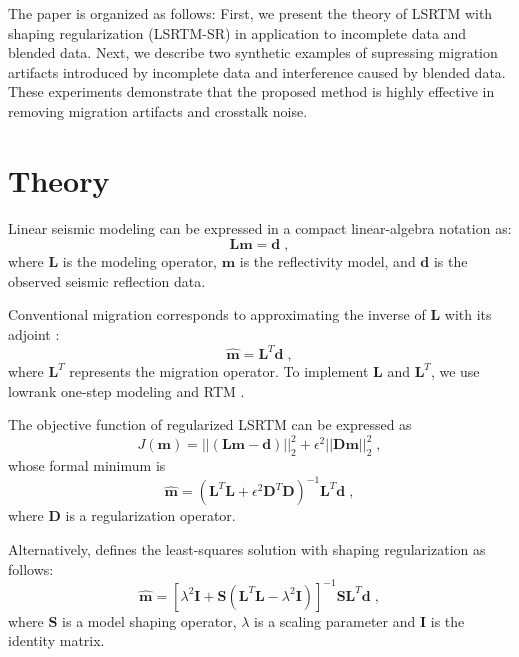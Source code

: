 The paper is organized as follows: First, we present the theory of LSRTM with shaping regularization 
(LSRTM-SR) in application to incomplete data and blended data.
Next, we describe two synthetic examples of supressing migration artifacts introduced by incomplete data and interference caused by blended data.
These experiments demonstrate that the proposed method is highly effective in removing migration artifacts and crosstalk noise.
 
\section{Theory}
Linear seismic modeling can be expressed in a compact linear-algebra notation as:
\begin{equation}
\label{eq:bornmodel}
\mathbf{Lm} = \mathbf{d} \; ,
\end{equation}
where $\mathbf{L}$ is the modeling operator, $\mathbf{m}$ is the reflectivity model, and $\mathbf{d}$ is the observed seismic reflection data.

Conventional migration corresponds to approximating the inverse of $\mathbf{L}$ with its adjoint \cite[]{jon92}:
\begin{equation}
\label{eq:cam}
\hat{\mathbf{m}} = \mathbf{L}^T\mathbf{d} \; ,
\end{equation}  
where $\mathbf{L}^T$ represents the migration operator. 
To implement $\mathbf{L}$ and $\mathbf{L}^T$, we use lowrank one-step modeling and RTM \cite[]{junzhe14,sun15}.

The objective function of regularized LSRTM can be expressed as
\begin{equation}
\label{eq:lsrtm}
J(\mathbf{m})=\mathbf{||(Lm-d)||}^2_2+\epsilon^2||\mathbf{Dm}||^2_2 \; ,
\end{equation}
whose formal minimum is
\begin{equation}
\label{eq:solution}
\hat{\mathbf{m}}=(\mathbf{L}^T\mathbf{L}+{\epsilon}^2 \mathbf{D}^T \mathbf{D})^{-1} \mathbf{L}^T \mathbf{d} \; ,
\end{equation}
where $\mathbf{D}$ is a regularization operator.

Alternatively, \cite{sergeyshape1} defines the least-squares solution with shaping regularization as follows:
\begin{equation}
\label{eq:lsshape}
\hat{\mathbf{m}} = \left[\lambda^2\mathbf{I} + \mathbf{S}(\mathbf{L}^T\mathbf{L}-\lambda^2\mathbf{I})\right]^{-1}\mathbf{S}\mathbf{L}^T\mathbf{d} \; ,
\end{equation}
where $\mathbf{S}$ is a model shaping operator, $\lambda$ is a scaling parameter
and $\mathbf{I}$ is the identity matrix.

